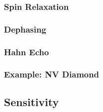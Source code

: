 \subsubsection{Spin Relaxation}
\subsubsection{Dephasing}
\subsubsection{Hahn Echo}
\cite{Wu2016}
\subsubsection{Example: NV Diamond}


\subsection{Sensitivity}
\cite{RevModPhys.92.015004}

\cite{PhysRevApplied.4.014009}


\cite{PhysRevApplied.15.064022}

\cite{PhysRevResearch.2.023394}


\cite{Castelletto2019}


